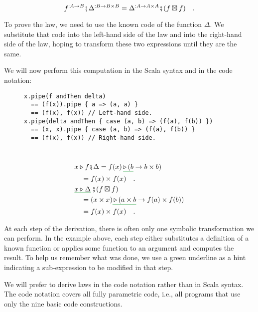 ~\vspace{-0.3\baselineskip}
\[
f^{:A\rightarrow B}\bef\Delta^{:B\rightarrow B\times B}=\Delta^{:A\rightarrow A\times A}\bef(f\boxtimes f)\quad.
\]

\noindent To prove the law, we need to use the known code of the function
$\Delta$. We substitute that code into the left-hand side of the
law and into the right-hand side of the law, hoping to transform these
two expressions until they are the same.

We will now perform this computation in the Scala syntax and in the
code notation:

\begin{wrapfigure}{L}{0.54\columnwidth}%
\vspace{-0.6\baselineskip}
\begin{lstlisting}
x.pipe(f andThen delta)
  == (f(x)).pipe { a => (a, a) }
  == (f(x), f(x)) // Left-hand side.
x.pipe(delta andThen { case (a, b) => (f(a), f(b)) })
  == (x, x).pipe { case (a, b) => (f(a), f(b)) }
  == (f(x), f(x)) // Right-hand side.
\end{lstlisting}
\vspace{-3\baselineskip}
\end{wrapfigure}%

~\vspace{-1.4\baselineskip}
\begin{align*}
 & x\triangleright f\bef\Delta=f(x)\,\gunderline{\triangleright\,(b}\rightarrow b\times b)\\
 & \quad=f(x)\times f(x)\quad.\\
 & \gunderline{x\triangleright\Delta}\,\bef(f\boxtimes f)\\
 & \quad=(x\times x)\gunderline{\,\triangleright\,(a\times b}\rightarrow f(a)\times f(b))\\
 & \quad=f(x)\times f(x)\quad.
\end{align*}
\vspace{-1.5\baselineskip}

At each step of the derivation, there is often only one symbolic transformation
we can perform. In the example above, each step either substitutes
a definition of a known function or applies some function to an argument
and computes the result. To help us remember what was done, we use
a green underline as a hint indicating a sub-expression to be modified
in that step. 

We will prefer to derive laws in the code notation rather than in
Scala syntax. The code notation covers all fully parametric code,
i.e., all programs that use only the nine basic code constructions.

